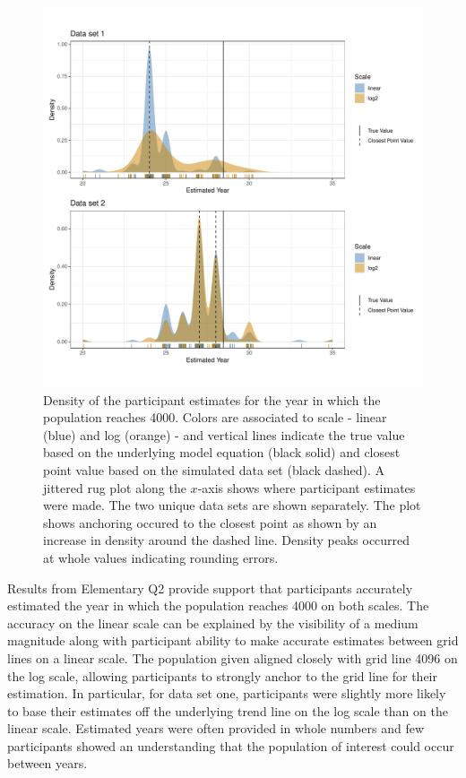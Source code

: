 \documentclass[print]{nuthesis}
\begin{document}
\begin{figure}[tbp]

{\centering \includegraphics[width=1\linewidth,]{thesis_files/figure-latex/qe2-density-plot-1} 

}

\caption[Elementary Q2 density]{Density of the participant estimates for the year in which the population reaches 4000. Colors are associated to scale - linear (blue) and log (orange) - and vertical lines indicate the true value based on the underlying model equation (black solid) and closest point value based on the simulated data set (black dashed). A jittered rug plot along the $x$-axis shows where participant estimates were made. The two unique data sets are shown separately. The plot shows anchoring occured to the closest point as shown by an increase in density around the dashed line. Density peaks occurred at whole values indicating rounding errors.}\label{fig:qe2-density-plot}
\end{figure}

Results from Elementary Q2 provide support that participants accurately estimated the year in which the population reaches 4000 on both scales.
The accuracy on the linear scale can be explained by the visibility of a medium magnitude along with participant ability to make accurate estimates between grid lines on a linear scale.
The population given aligned closely with grid line 4096 on the log scale, allowing participants to strongly anchor to the grid line for their estimation.
In particular, for data set one, participants were slightly more likely to base their estimates off the underlying trend line on the log scale than on the linear scale.
Estimated years were often provided in whole numbers and few participants showed an understanding that the population of interest could occur between years.
\end{document}
